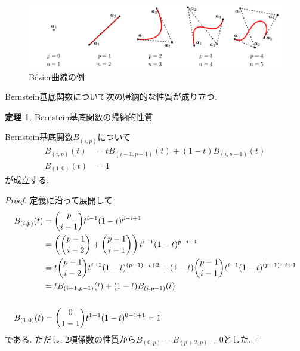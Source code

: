 \documentclass{jsarticle}
\newcommand\Pare[1]{\left(#1\right)}
\newcommand\nCr[2]{\binom{#1}{#2}}
\theoremstyle{definition}%
\newtheorem{thm}{定理}
\begin{document}
\addtocounter{footnote}{-1}
\begin{figure}[htbp]
	\centering
    \includegraphics[page=1,clip,width=160mm]{fig.pdf}
	\caption{B\'ezier曲線の例\protect \footnotemark}
	\label{Fig101}
\end{figure}
Bernstein基底関数について次の帰納的な性質が成り立つ.
\begin{screen}
	\begin{thm}
		\label{Thm101}
		Bernstein基底関数の帰納的性質

        Bernstein基底関数$B_{(i,p)}$について
		\begin{align}
			B_{(i,p)}(t)&=tB_{(i-1,p-1)}(t)+(1-t)B_{(i,p-1)}(t) \\
    		B_{(1,0)}(t)&=1
		\end{align}
		が成立する.
	\end{thm}
\end{screen}
\begin{proof}
    定義に沿って展開して
    \begin{align}
        &\begin{aligned}
            B_{(i,p)}(t)
            &=\nCr{p}{i-1}t^{i-1}(1-t)^{p-i+1} \\
            &=\Pare{\nCr{p-1}{i-2}+\nCr{p-1}{i-1}}t^{i-1}(1-t)^{p-i+1} \\
            &=t\nCr{p-1}{i-2}t^{i-2}(1-t)^{(p-1)-i+2}+(1-t)\nCr{p-1}{i-1}t^{i-1}(1-t)^{(p-1)-i+1} \\
            &=tB_{(i-1,p-1)}(t)+(1-t)B_{(i,p-1)}(t)
        \end{aligned} \\ \notag \\
        &\begin{aligned}
            B_{(1,0)}(t)
            &=\nCr{0}{1-1}t^{1-1}(1-t)^{0-1+1}
            =1
        \end{aligned}
    \end{align}
    である.
    ただし, $2$項係数の性質から$B_{(0,p)}=B_{(p+2,p)}=0$とした.
\end{proof}
\end{document}
